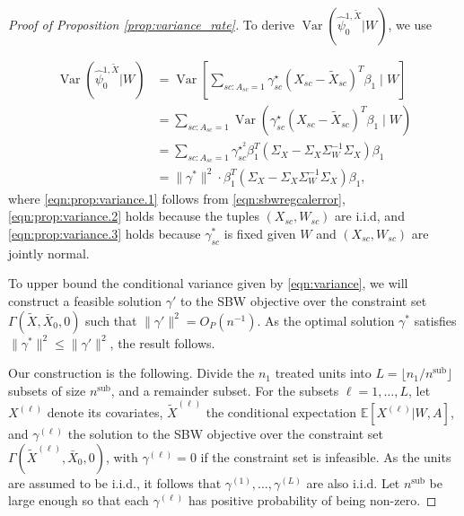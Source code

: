\begin{proof}[Proof of Proposition \ref{prop:variance_rate}] 
To derive $\operatorname{Var}\left(\hat{\psi}_0^{1,\tilde{X}} | W\right)$, we use

\begin{align}
\operatorname{Var}\left(\hat{\psi}_0^{1,\tilde{X}} | W\right) &= \operatorname{Var}\left[\sum_{sc: A_{sc} = 1}\gamma_{sc}^\star(X_{sc} - \tilde{X}_{sc})^T\beta_1 \mid W\right] \label{eqn:prop:variance.1}\\
 &= \sum_{sc: A_{sc} = 1} \operatorname{Var}(\gamma_{sc}^\star(X_{sc} - \tilde{X}_{sc})^T\beta_1 \mid W) \label{eqn:prop:variance.2}\\
 &= \sum_{sc: A_{sc} = 1} \gamma_{sc}^{\star^2}\beta_1^T(\Sigma_{X} - \Sigma_{X}\Sigma_{W}^{-1}\Sigma_{X})\beta_1  \label{eqn:prop:variance.3}\\
& = \|\gamma^*\|^2 \cdot \beta_1^T(\Sigma_{X} - \Sigma_{X}\Sigma_{W}^{-1}\Sigma_{X})\beta_1,  \label{eqn:variance}
\end{align}
%
where \eqref{eqn:prop:variance.1} follows from \eqref{eqn:sbwregcalerror}, \eqref{eqn:prop:variance.2} holds because the tuples $(X_{sc}, W_{sc})$ are i.i.d, and \eqref{eqn:prop:variance.3} holds because $\gamma_{sc}^*$ is fixed given $W$ and $(X_{sc}, W_{sc})$ are jointly normal. 




To upper bound the conditional variance given by \eqref{eqn:variance}, we will construct a feasible solution $\gamma'$ to the SBW objective over the constraint set $\Gamma(\tilde{X}, \bar{X}_0, 0)$ such that $\|\gamma'\|^2 = O_P(n^{-1})$. As the optimal solution $\gamma^*$ satisfies $\|\gamma^*\|^2 \leq \|\gamma'\|^2$, the result follows.

Our construction is the following. Divide the $n_1$ treated units into $L = \lfloor n_1/n^{\text{sub}} \rfloor$ subsets of size $n^{\text{sub}}$, and a remainder subset. For the subsets $\ell=1,\ldots,L$, let $X^{(\ell)}$ denote its covariates, $\tilde{X}^{(\ell)}$ the conditional expectation $\mathbb{E}[X^{(\ell)}|W, A]$, and  $\gamma^{(\ell)}$ the solution to the SBW objective over the constraint set $\Gamma(\tilde{X}^{(\ell)}, \bar{X}_0, 0)$, with $\gamma^{(\ell)}=0$ if the constraint set is infeasible. As the units are assumed to be i.i.d., it follows that $\gamma^{(1)}, \ldots, \gamma^{(L)}$ are also i.i.d. Let $n^{\text{sub}}$ be large enough so that each $\gamma^{(\ell)}$ has positive probability of being non-zero. 


\end{proof}
